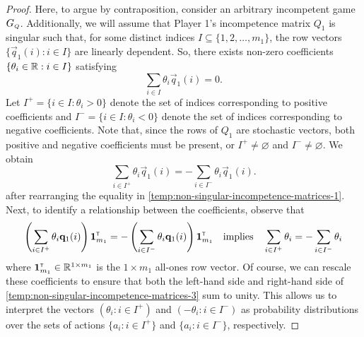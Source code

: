    \begin{proof}
        Here, to argue by contraposition, consider an arbitrary incompetent game $G_\ms{Q}$.
        Additionally, we will assume that Player 1's incompetence matrix $Q_1$ is singular such that, for some distinct indices $I \subseteq \{1, 2, \ldots, m_1\}$, the row vectors $\{\vec{q}_1(i) : i \in I\}$ are linearly dependent.
        So, there exists non-zero coefficients $\{\theta_i \in \mathbb{R} : i \in I\}$ satisfying
        \begin{equation} \label{temp:non-singular-incompetence-matrices-1}
            \sum_{i \in I} \theta_i \vec{q}_1(i)
                = 0.
        \end{equation}
        Let $I^+ = \{i \in I : \theta_i > 0\}$ denote the set of indices corresponding to positive coefficients and $I^- = \{i \in I : \theta_i < 0\}$ denote the set of indices corresponding to negative coefficients.
        Note that, since the rows of $Q_1$ are stochastic vectors, both positive and negative coefficients must be present, or $I^+ \neq \varnothing$ and $I^- \neq \varnothing$.
        We obtain
        \begin{equation}  \label{temp:non-singular-incompetence-matrices-2}
            \sum_{i \in I^+} \theta_i \vec{q}_1(i)
                = - \sum_{i \in I^-} \theta_i \vec{q}_1(i).
        \end{equation}
        after rearranging the equality in \eqref{temp:non-singular-incompetence-matrices-1}.
        Next, to identify a relationship between the coefficients, observe that
        \begin{equation} \label{temp:non-singular-incompetence-matrices-3}
            \left( \sum_{i \in I^+} \theta_i \mathbf{q}_1(i) \right) \mathbf{1}_{m_1}^{\scriptscriptstyle \mathsf{T}}
                = - \left( \sum_{i \in I^-} \theta_i \mathbf{q}_1(i) \right) \mathbf{1}_{m_1}^{\scriptscriptstyle \mathsf{T}}
            \quad\text{implies}\quad
            \sum_{i \in I^+} \theta_i
                = - \sum_{i \in I^-} \theta_i
        \end{equation}
        where $\mathbf{1}_{m_1}^{\scriptscriptstyle \mathsf{T}} \in \mathbb{R}^{1 \times m_1}$ is the $1 \times m_1$ all-ones row vector.
        Of course, we can rescale these coefficients to ensure that both the left-hand side and right-hand side of \eqref{temp:non-singular-incompetence-matrices-3} sum to unity.
        This allows us to interpret the vectors $(\theta_i : i \in I^+)$ and $(-\theta_i : i \in I^-)$ as probability distributions over the sets of actions $\{a_i : i \in I^+\}$ and $\{a_i : i \in I^-\}$, respectively.


\end{proof}
